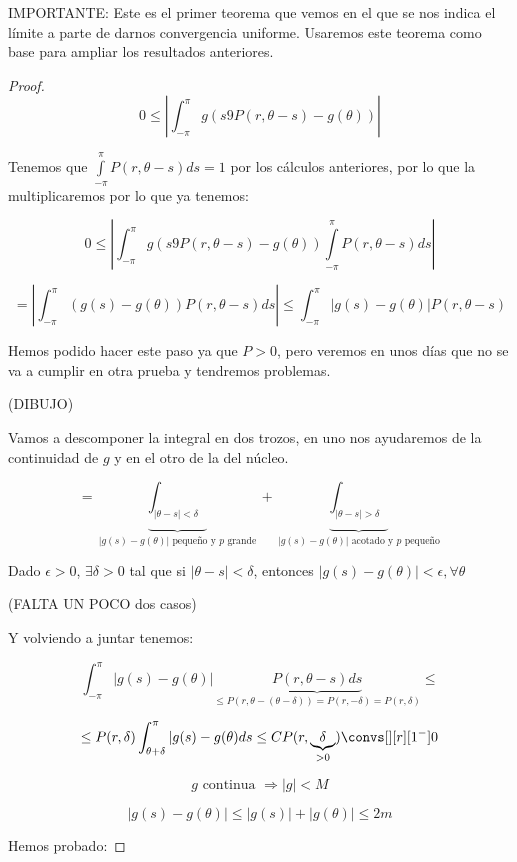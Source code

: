 \begin{itemize}
\begin{theorem}
				IMPORTANTE: Este es el primer teorema que vemos en el que se nos indica el límite a parte de darnos convergencia uniforme. Usaremos este teorema como base para ampliar los resultados anteriores.

				\begin{proof}

					\[0 \leq \left| \int_{-\pi}^{\pi} g(s9 P(r, \theta-s) - g(\theta))  \right| \]

					Tenemos que $\int\limits_{-\pi}^{\pi} P(r, \theta-s) ds = 1$ por los cálculos anteriores, por lo que la multiplicaremos por lo que ya tenemos:

					\[0 \leq \left| \int_{-\pi}^{\pi} g(s9 P(r, \theta-s) - g(\theta))  \int\limits_{-\pi}^{\pi} P(r, \theta-s) ds  \right| \]

					\[ = \left| \int_{-\pi}^\pi (g(s) - g(\theta)) P(r, \theta - s) ds \right|  \leq \int^{\pi}_{-\pi} | g(s) - g(\theta) | P(r, \theta- s) \]

					Hemos podido hacer este paso ya que $P>0$, pero veremos en unos días que no se va a cumplir en otra prueba y tendremos problemas.


					(DIBUJO)

					Vamos a descomponer la integral en dos trozos, en uno nos ayudaremos de la continuidad de $g$ y en el otro de la del núcleo.

					\[ = \underbrace{\int_{|\theta-s|< \delta}}_{|g(s) - g(\theta)| \text{ pequeño y }p\text{ grande}} + \underbrace{\int_{|\theta-s| > \delta}}_{|g(s) - g(\theta)| \text{ acotado y }p\text{ pequeño}} \]

					Dado $\epsilon > 0$, $\exists \delta > 0$ tal que si $|\theta-s| < \delta$, entonces $|g(s) - g(\theta)| < \epsilon, \forall \theta$

					(FALTA UN POCO dos casos)

					Y volviendo a juntar tenemos:

					\[ \int^{\pi}_{-\pi} |g(s) - g(\theta) | \underbrace{P(r, \theta-s) ds}_{\leq P(r, \theta-(\theta-\delta)) = P(r, -\delta) = P(r, \delta)} \leq   \]

					\[\leq P(r, \delta) \int^{\pi}_{\theta+\delta} |g(s) - g(\theta) ds \leq C P(r, \underbrace{\delta}_{> 0}) \convs[][r][1^-] 0  \]

					\[g \text{ continua } \Rightarrow |g| < M \]

					\[ |g(s)  - g(\theta)| \leq |g(s)| + | g(\theta) | \leq 2m \]


					Hemos probado:


\end{proof}
\end{theorem}
\end{itemize}
